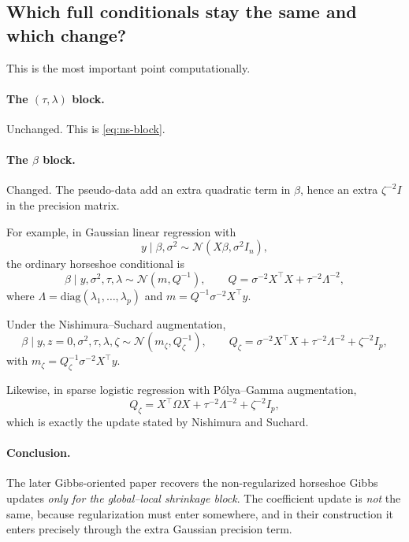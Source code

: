 \documentclass[11pt]{article}
\newcommand{\Normal}{\mathcal{N}}
\newcommand{\diag}{\mathrm{diag}}
\begin{document}
\subsection{Which full conditionals stay the same and which change?}

This is the most important point computationally.

\paragraph{The $(\tau,\lambda)$ block.}
Unchanged. This is \eqref{eq:ns-block}.

\paragraph{The $\beta$ block.}
Changed. The pseudo-data add an extra quadratic term in $\beta$, hence an extra $\zeta^{-2}I$ in the precision matrix.

For example, in Gaussian linear regression with
\[
y \mid \beta,\sigma^2 \sim \Normal(X\beta,\sigma^2 I_n),
\]
the ordinary horseshoe conditional is
\[
\beta \mid y,\sigma^2,\tau,\lambda \sim \Normal(m,Q^{-1}),
\qquad
Q = \sigma^{-2}X^\top X + \tau^{-2}\Lambda^{-2},
\]
where $\Lambda=\diag(\lambda_1,\dots,\lambda_p)$ and $m=Q^{-1}\sigma^{-2}X^\top y$.

Under the Nishimura--Suchard augmentation,
\begin{equation}
\beta \mid y,z=0,\sigma^2,\tau,\lambda,\zeta
\sim
\Normal(m_\zeta,Q_\zeta^{-1}),
\qquad
Q_\zeta
=
\sigma^{-2}X^\top X + \tau^{-2}\Lambda^{-2} + \zeta^{-2}I_p,
\label{eq:gaussian-beta-update}
\end{equation}
with $m_\zeta = Q_\zeta^{-1}\sigma^{-2}X^\top y$.

Likewise, in sparse logistic regression with P\'olya--Gamma augmentation,
\begin{equation}
Q_\zeta = X^\top \Omega X + \tau^{-2}\Lambda^{-2} + \zeta^{-2}I_p,
\label{eq:logistic-beta-update}
\end{equation}
which is exactly the update stated by Nishimura and Suchard.

\paragraph{Conclusion.}
The later Gibbs-oriented paper recovers the non-regularized horseshoe Gibbs updates \emph{only for the global--local shrinkage block}. The coefficient update is \emph{not} the same, because regularization must enter somewhere, and in their construction it enters precisely through the extra Gaussian precision term.
\end{document}
